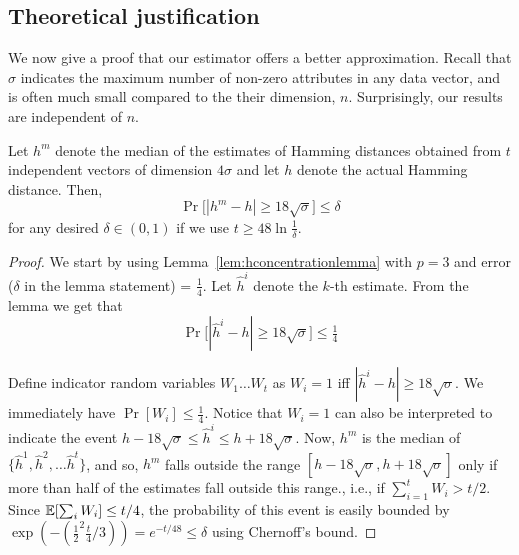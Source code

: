     
\subsection{Theoretical justification}\label{appendix:subsec:minfsketch}

%

We now give a proof that our \minfsketch estimator offers a better
approximation. Recall that $\sigma$ indicates the maximum number of non-zero
attributes in any data vector, and is often much small compared to the their
dimension, $n$. Surprisingly, our results are independent of $n$.
\begin{lem}\label{lem:medianlemma}
    Let $h^m$ denote the median of the estimates of Hamming distances obtained
    from $t$ independent
    \fsketch vectors of dimension $4\sigma$ and let $h$ denote the actual Hamming distance. Then,
    $$\Pr\big[|h^m - h| \ge 18\sqrt{\sigma}\big] \le \delta$$
    for any desired $\delta \in (0,1)$ if we use $t \ge 48\ln \tfrac{1}{\delta}$.
\end{lem}

\begin{proof}
    We start by using Lemma~\ref{lem:hconcentrationlemma} with
    $p=3$ and error ($\delta$ in the lemma statement) = $\tfrac{1}{4}$. Let
    $\hat{h}^i$ denote the $k$-th estimate. From the lemma we get that
    $$\Pr\big[ |\hat{h}^i - h| \ge 18\sqrt{\sigma} \big] \le \tfrac{1}{4}$$

    Define indicator random variables $W_1 \ldots W_t$ as $W_i=1$ iff
    $|\hat{h}^i - h| \ge 18\sqrt{\sigma}$. We immediately have $\Pr[W_i] \le
    \tfrac{1}{4}$. 
    Notice that $W_i=1$ can also be interpreted to indicate the event
    $h-18\sqrt{\sigma} \le \hat{h}^i \le h + 18 \sqrt{\sigma}$.
    Now, $h^m$ is the median of $\{\hat{h}^1, \hat{h}^2, \ldots
    \hat{h}^t\}$, and so, $h^m$ falls outside the range $[h-18\sqrt{\sigma},
    h+18\sqrt{\sigma}]$ only if more than half of the estimates fall outside this
    range., i.e., if $\sum_{i=1}^t W_i > t/2$. Since $\mathbb{E}[\sum_i W_i] \le t/4$, the probability of this event is
    easily bounded by $\exp{(-(\tfrac{1}{2}^2
    \tfrac{t}{4}/3))} = e^{-t/48} \le \delta$ using Chernoff's bound.
\end{proof}


